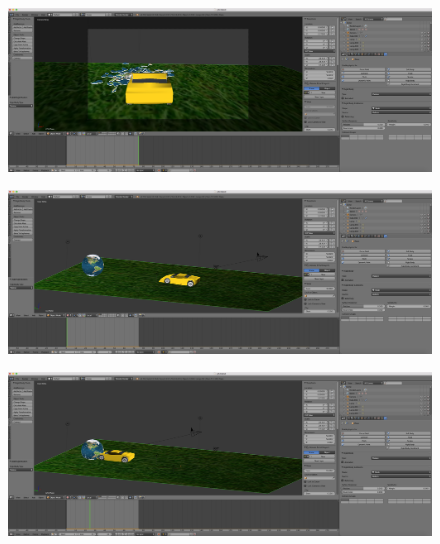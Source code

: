 \documentclass[10pt]{article}
\begin{document}
\begin{figure}[H]
	\begin{center}
	 		\includegraphics[width = 1.00\textwidth]{Imagenes/p5-img19}
	\end{center} 
\end{figure}

\begin{figure}[H]
	\begin{center}
	 		\includegraphics[width = 1.00\textwidth]{Imagenes/p5-img20}
	\end{center} 
\end{figure}

\begin{figure}[H]
	\begin{center}
	 		\includegraphics[width = 1.00\textwidth]{Imagenes/p5-img21}
	\end{center} 
\end{figure}
\end{document}
